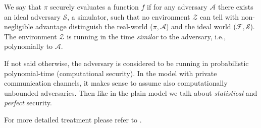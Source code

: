 \documentclass[
  digital, %
  twoside, %
  table,   %
  lof,     %
  lot,     %
]{fithesis3}
\theoremstyle{definition}
\theoremstyle{remark}
\begin{document}

We say that $\pi$ securely evaluates a function $f$ if for any adversary $\mathcal{A}$ there exists an ideal adversary $\mathcal{S}$, a simulator, such that no environment $\mathcal{Z}$ can tell with non-negligible advantage distinguish the real-world ($\pi, \mathcal{A}$) and the ideal world ($\mathcal{F}, \mathcal{S}$). The environment $\mathcal{Z}$ is running in the time \emph{similar} to the adversary, i.e., polynomially to $\mathcal{A}$.

If not said otherwise, the adversary is considered to be running in probabilistic polynomial-time (computational security). In the model with private communication channels, it makes sense to assume also computationally unbounded adversaries. Then like in the plain model we talk about \emph{statistical} and \emph{perfect} security.

For more detailed treatment please refer to \cite{Can01, CLOS02, Lin03, G09, CDN15, Lin17}.
\end{document}
